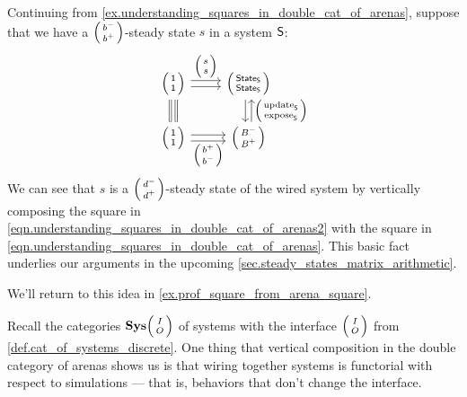 \documentclass[DynamicalBook]{subfiles}
\begin{document}
\begin{example}\label{ex.understanding_squares_in_double_cat_of_arenas2}
  Continuing from \cref{ex.understanding_squares_in_double_cat_of_arenas},
  suppose that we have a $\lens{b^-}{b^+}$-steady state $s$ in a system $\mathsf{S}$:
  \begin{equation}\label{eqn.understanding_squares_in_double_cat_of_arenas2}
    \begin{tikzcd}
      \lens{\ord{1}}{\ord{1}} \ar[r, shift left, "\lens{s}{s}"] \ar[r, shift
      right] \ar[d, shift right, equals] \ar[d, shift left, equals] &
      \lens{\State{S}}{\State{S}} \ar[d, shift left, leftarrow,
      "\lens{\update{S}}{\expose{S}}"] \ar[d, shift right]\\
      \lens{\ord{1}}{\ord{1}} \ar[r, shift right, "\lens{b^+}{b^-}"'] \ar[r,
      shift left] & \lens{B^-}{B^+}
    \end{tikzcd}
  \end{equation}
  We can see that $s$ is a $\lens{d^-}{d^+}$-steady state of the wired system by
  vertically composing the square in
  \cref{eqn.understanding_squares_in_double_cat_of_arenas2} with the square in
  \cref{eqn.understanding_squares_in_double_cat_of_arenas}. This basic fact
  underlies our arguments in the upcoming \cref{sec.steady_states_matrix_arithmetic}. 

We'll return to this idea in \cref{ex.prof_square_from_arena_square}.
\end{example}

Recall the categories $\Cat{Sys}\lens{I}{O}$ of systems with the interface
$\lens{I}{O}$ from
\cref{def.cat_of_systems_discrete}. One thing that vertical composition in the
double category of arenas shows us is that wiring together systems is functorial
with respect to simulations --- that is, behaviors that don't change the
interface.
\end{document}
